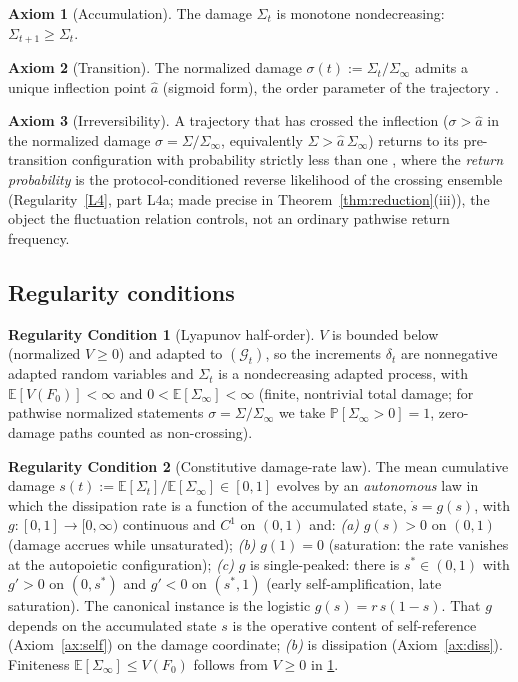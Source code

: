 \documentclass[11pt]{article}
\theoremstyle{plain}
\theoremstyle{definition}
\newtheorem{axiom}{Axiom}
\newtheorem{regularity}{Regularity Condition}
\theoremstyle{remark}
\newcommand{\E}{\mathbb{E}}
\begin{document}
\begin{axiom}[Accumulation]\label{ax:acc}
The damage $\Sigma_t$ is monotone nondecreasing: $\Sigma_{t+1}\ge\Sigma_t$.
\end{axiom}

\begin{axiom}[Transition]\label{ax:trans}
The normalized damage $\sigma(t):=\Sigma_t/\Sigma_\infty$ admits a unique inflection point $\hat a$ (sigmoid form), the order parameter of the trajectory \citep{scheffer2009}.
\end{axiom}

\begin{axiom}[Irreversibility]\label{ax:irr}
A trajectory that has crossed the inflection ($\sigma>\hat a$ in the normalized damage $\sigma=\Sigma/\Sigma_\infty$, equivalently $\Sigma>\hat a\,\Sigma_\infty$) returns to its pre-transition configuration with probability strictly less than one \citep{seifert2012}, where the \emph{return probability} is the protocol-conditioned reverse likelihood of the crossing ensemble (Regularity~\ref{L4}, part L4a; made precise in Theorem~\ref{thm:reduction}(iii)), the object the fluctuation relation controls, not an ordinary pathwise return frequency.
\end{axiom}

\subsection{Regularity conditions}

\begin{regularity}[Lyapunov half-order]\label{L1}
$V$ is bounded below (normalized $V\ge0$) and adapted to $(\mathcal G_t)$, so the increments $\delta_t$ are nonnegative adapted random variables and $\Sigma_t$ is a nondecreasing adapted process, with $\E[V(F_0)]<\infty$ and $0<\E[\Sigma_\infty]<\infty$ (finite, nontrivial total damage; for pathwise normalized statements $\sigma=\Sigma/\Sigma_\infty$ we take $\mathbb P[\Sigma_\infty>0]=1$, zero-damage paths counted as non-crossing).
\end{regularity}

\begin{regularity}[Constitutive damage-rate law]\label{L2}
The mean cumulative damage $s(t):=\E[\Sigma_t]/\E[\Sigma_\infty]\in[0,1]$ evolves by an \emph{autonomous} law in which the dissipation rate is a function of the accumulated state, $\dot s=g(s)$, with $g:[0,1]\to[0,\infty)$ continuous and $C^1$ on $(0,1)$ and: \emph{(a)} $g(s)>0$ on $(0,1)$ (damage accrues while unsaturated); \emph{(b)} $g(1)=0$ (saturation: the rate vanishes at the autopoietic configuration); \emph{(c)} $g$ is single-peaked: there is $s^\ast\in(0,1)$ with $g'>0$ on $(0,s^\ast)$ and $g'<0$ on $(s^\ast,1)$ (early self-amplification, late saturation). The canonical instance is the logistic $g(s)=r\,s(1-s)$. That $g$ depends on the accumulated state $s$ is the operative content of self-reference (Axiom~\ref{ax:self}) on the damage coordinate; \emph{(b)} is dissipation (Axiom~\ref{ax:diss}). Finiteness $\E[\Sigma_\infty]\le V(F_0)$ follows from $V\ge0$ in \ref{L1}.
\end{regularity}
\end{document}
